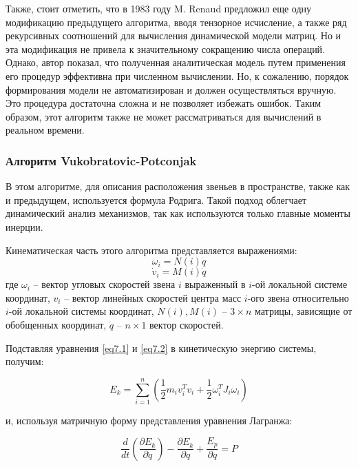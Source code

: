 Также, стоит отметить, что в 1983 году M. Renaud предложил еще одну модификацию предыдущего алгоритма, вводя тензорное исчисление, а также ряд рекурсивных соотношений для вычисления динамической модели матриц. Но и эта модификация не привела к значительному сокращению числа операций. Однако, автор показал, что полученная аналитическая модель путем применения его процедур эффективна при численном вычислении. Но, к сожалению, порядок формирования модели не автоматизирован и должен осуществляться вручную. Это процедура достаточна сложна и не позволяет избежать ошибок. Таким образом, этот алгоритм также не может рассматриваться для вычислений в реальном времени.

\subsubsection{Алгоритм Vukobratovic-Potconjak}
В этом алгоритме, для описания расположения звеньев в пространстве, также как и предыдущем, используется формула Родрига. Такой подход облегчает динамический анализ механизмов, так как используются только главные моменты инерции.

Кинематическая часть этого алгоритма представляется выражениями:
\begin{equation}\label{eq7.1}
\omega_i = N(i) \dot q
\end{equation}
\begin{equation}\label{eq7.2}
\dot v_i = M(i) \dot q
\end{equation}
где $\omega_i$ -- вектор угловых скоростей звена $i$ выраженный в $i$-ой локальной системе координат, $v_i$ -- вектор линейных скоростей центра масс $i$-ого звена относительно $i$-ой локальной системы координат, $N(i), M(i)$ -- $3 \times n$ матрицы, зависящие от обобщенных координат, $\dot q$ -- $n \times 1$ вектор скоростей.

Подставляя уравнения \ref{eq7.1} и \ref{eq7.2} в кинетическую энергию системы, получим:

\begin{equation}
E_k = \sum_{i=1}^{n} (\frac{1}{2} m_i v_i^T v_i + \frac{1}{2} \omega_i^T J_i \omega_i)
\end{equation}

и, используя матричную форму представления уравнения Лагранжа:

\begin{equation}
\frac{d}{dt}
(\frac{\partial E_k}{\partial \dot q})
- \frac{\partial E_k}{\partial q} + \frac{E_p}{\partial q} = P
\end{equation}

